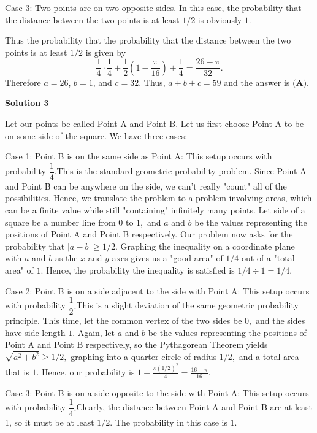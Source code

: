 \begin{enumerate}
 Case 3: Two points are on two opposite sides. In this case, the probability that the distance between the two points is at least $1/2$ is obviously $1$. 

 Thus the probability that the probability that the distance between the two points is at least $1/2$ is given by 
 \[\frac{1}{4} \cdot \frac{1}{4}+ \frac{1}{2}\left(1 - \frac{\pi}{16}\right) + \frac{1}{4} =\frac{26-\pi}{32}.\]Therefore $a=26$, $b=1$, and $c=32$. Thus, $a+b+c=59$ and the answer is $\textbf{(A).}$




\textbf{Solution 3}

Let our points be called Point A and Point B. Let us first choose Point A to be on some side of the square. We have three cases:

 Case 1: Point B is on the same side as Point A: This setup occurs with probability $\dfrac{1}{4}.$This is the standard geometric probability problem. Since Point A and Point B can be anywhere on the side, we can't really "count" all of the possibilities. Hence, we translate the problem to a problem involving areas, which can be a finite value while still "containing" infinitely many points. Let side of a square be a number line from $0$ to $1,$ and $a$ and $b$ be the values representing the positions of Point A and Point B respectively. Our problem now asks for the probability that $|a-b| \geq 1/2.$ Graphing the inequality on a coordinate plane with $a$ and $b$ as the $x$ and $y$-axes gives us a "good area" of $1/4$ out of a "total area" of $1.$ Hence, the probability the inequality is satisfied is $1/4 \div 1 = 1/4.$

 Case 2: Point B is on a side adjacent to the side with Point A: This setup occurs with probability $\dfrac{1}{2}.$This is a slight deviation of the same geometric probability principle. This time, let the common vertex of the two sides be $0,$ and the sides have side length $1.$ Again, let $a$ and $b$ be the values representing the positions of Point A and Point B respectively, so the Pythagorean Theorem yields $\sqrt{a^2+b^2}\geq 1/2,$ graphing into a quarter circle of radius $1/2,$ and a total area that is $1.$ Hence, our probability is $1-\frac{\pi(1/2)^2}{4} = \frac{16-\pi}{16}.$

 
Case 3: Point B is on a side opposite to the side with Point A: This setup occurs with probability $\dfrac{1}{4}.$Clearly, the distance between Point A and Point B are at least 1, so it must be at least $1/2.$ The probability in this case is $1.$


\end{enumerate}
